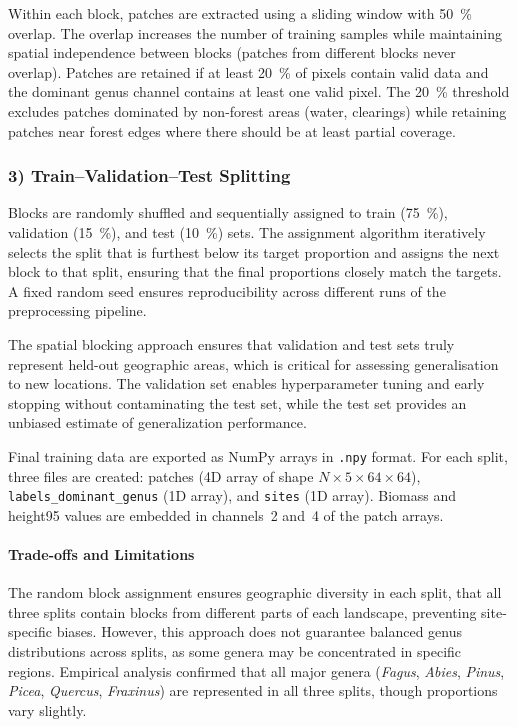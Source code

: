 Within each block, patches are extracted using a sliding window with \SI{50}{\percent} overlap. The overlap increases the number of training samples while maintaining spatial independence between blocks (patches from different blocks never overlap). Patches are retained if at least \SI{20}{\percent} of pixels contain valid data and the dominant genus channel contains at least one valid pixel. The \SI{20}{\percent} threshold excludes patches dominated by non-forest areas (water, clearings) while retaining patches near forest edges where there should be at least partial coverage.

\subsubsection{3) Train--Validation--Test Splitting}

Blocks are randomly shuffled and sequentially assigned to train (\SI{75}{\percent}), validation (\SI{15}{\percent}), and test (\SI{10}{\percent}) sets. The assignment algorithm iteratively selects the split that is furthest below its target proportion and assigns the next block to that split, ensuring that the final proportions closely match the targets. A fixed random seed ensures reproducibility across different runs of the preprocessing pipeline.

The spatial blocking approach ensures that validation and test sets truly represent held-out geographic areas, which is critical for assessing generalisation to new locations. The validation set enables hyperparameter tuning and early stopping without contaminating the test set, while the test set provides an unbiased estimate of generalization performance.

Final training data are exported as NumPy arrays in \texttt{.npy} format. For each split, three files are created: patches (4D array of shape $N\times 5\times 64\times 64$), \texttt{labels\_dominant\_genus} (1D array), and \texttt{sites} (1D array). Biomass and height95 values are embedded in channels~2 and~4 of the patch arrays.

\paragraph{Trade-offs and Limitations}

The random block assignment ensures geographic diversity in each split, that all three splits contain blocks from different parts of each landscape, preventing site-specific biases. However, this approach does not guarantee balanced genus distributions across splits, as some genera may be concentrated in specific regions. Empirical analysis confirmed that all major genera (\textit{Fagus}, \textit{Abies}, \textit{Pinus}, \textit{Picea}, \textit{Quercus}, \textit{Fraxinus}) are represented in all three splits, though proportions vary slightly.

